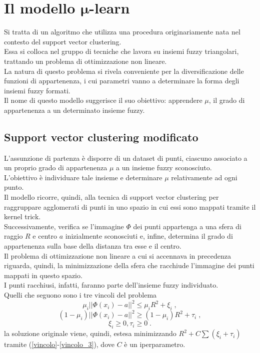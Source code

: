 \documentclass[12pt]{report}
\theoremstyle{definition}
\begin{document}
\section[\texorpdfstring{Il modello $\mu$-learn}%
                        {mu-learn}]%
        {Il modello $\bm{\mu}$-learn}  %
\label{mulearn}
Si tratta di un algoritmo che utilizza una procedura originariamente nata nel contesto del support vector clustering.
\\
Essa si colloca nel gruppo di tecniche che lavora su insiemi fuzzy triangolari, trattando un problema di ottimizzazione non lineare.
\\
La natura di questo problema si rivela conveniente per la diversificazione delle funzioni di appartenenza, i cui parametri vanno a determinare la forma degli insiemi fuzzy formati.
\\
Il nome di questo modello suggerisce il suo obiettivo: apprendere $\mu$, il grado di appartenenza a un determinato insieme fuzzy.

\subsection{Support vector clustering modificato}
L'assunzione di partenza è disporre di un dataset di punti, ciascuno associato a un proprio grado di appartenenza $\mu$ a un insieme fuzzy sconosciuto.
\\
L'obiettivo è individuare tale insieme e determinare $\mu$ relativamente ad ogni punto.
\\
Il modello ricorre, quindi, alla tecnica di support vector clustering \cite{23} per raggruppare agglomerati di punti in uno spazio in cui essi sono mappati tramite il kernel trick.
\\
Successivamente, verifica se l'immagine $\mathit{\Phi}$ dei punti appartenga a una sfera di raggio $R$ e centro $a$ inizialmente sconosciuti e, infine, determina il grado di appartenenza sulla base della distanza tra esse e il centro.
\\
Il problema di ottimizzazione non lineare a cui si accennava in precedenza riguarda, quindi, la minimizzazione della sfera che racchiude l'immagine dei punti mappati in questo spazio.
\\
I punti racchiusi, infatti, faranno parte dell'insieme fuzzy individuato.
\\
Quelli che seguono sono i tre vincoli del problema
\begin{equation}\label{vincolo}
    \mu_i || \mathit{\Phi}(x_i) - a ||^2 \leq \mu_iR^2 + \xi_i \;,
\end{equation}
\begin{equation}\label{vincolo_2}
    (1 - \mu_i) || \mathit{\Phi}(x_i) - a ||^2 \geq (1 - \mu_i)R^2 + \tau_i \;,
\end{equation}
\begin{equation}\label{vincolo_3}
    \xi_i \geq 0, \tau_i \geq 0 \;.
\end{equation}
la soluzione originale viene, quindi, estesa minimizzando $R^2 + C\sum(\xi_i + \tau_i)$ tramite (\ref{vincolo}-\ref{vincolo_3}), dove $C$ è un iperparametro.
\end{document}
